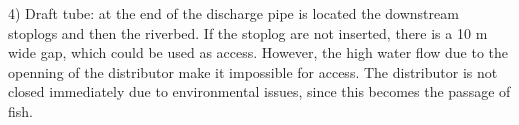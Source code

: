 


4) Draft tube: at the end of the discharge pipe is located the downstream
stoplogs and then the riverbed. If the stoplog are not inserted, there is a 10 m wide gap, which
could be used as access. However, the high water flow due to the
openning of the distributor make it impossible for access. The distributor is
not closed immediately due to environmental issues, since this becomes the
passage of fish.


